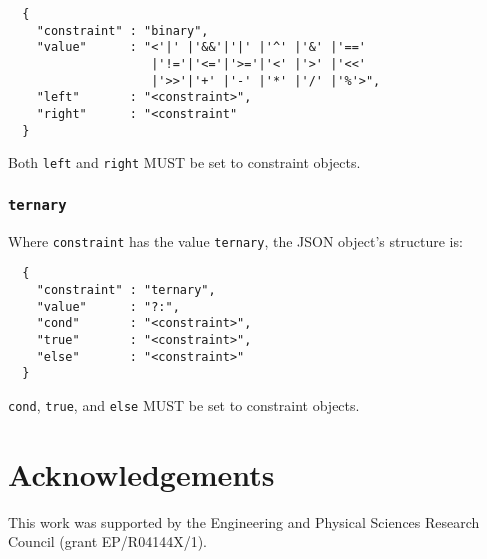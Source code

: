 \documentclass[twocolumn,a4paper]{article}
\begin{document}
\begin{verbatim}
  {
    "constraint" : "binary",
    "value"      : "<'|' |'&&'|'|' |'^' |'&' |'=='
                    |'!='|'<='|'>='|'<' |'>' |'<<'
                    |'>>'|'+' |'-' |'*' |'/' |'%'>",
    "left"       : "<constraint>",
    "right"	     : "<constraint"
  }
\end{verbatim}

Both \texttt{left} and \texttt{right} MUST be set to constraint objects.

\subsubsection{\texttt{ternary}}

Where \texttt{constraint} has the value \texttt{ternary}, the JSON object's structure is:

\begin{verbatim}
  {
    "constraint" : "ternary",
    "value"      : "?:",
    "cond"       : "<constraint>",
    "true"       : "<constraint>",
    "else"       : "<constraint>"
  }
\end{verbatim}

\texttt{cond}, \texttt{true}, and \texttt{else} MUST be set to constraint objects.

\section{Acknowledgements}

This work was supported by the Engineering and Physical Sciences Research
Council (grant EP/R04144X/1).



\ifpdf
  \ifdefined\pdftrailerid
    \pdftrailerid{}
  \fi
\fi
\end{document}
